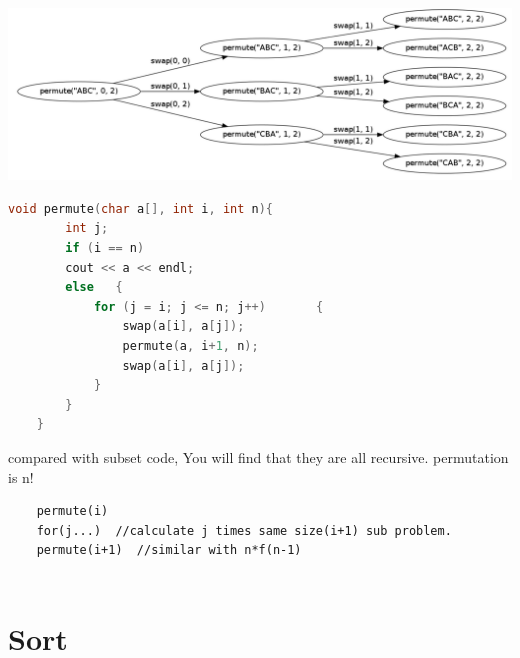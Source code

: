 \documentclass[a4paper,11pt,twoside]{book}
\begin{document}
\begin{itemize}
\includegraphics[scale=0.25]{pics/permutation.png}


\begin{lstlisting}[frame=single, language=c++]
	void permute(char a[], int i, int n){
		int j;
		if (i == n)
		cout << a << endl;
		else   {
			for (j = i; j <= n; j++)       {
				swap(a[i], a[j]);          
				permute(a, i+1, n);
				swap(a[i], a[j]);
			}
		}
	} 	
\end{lstlisting}

compared with subset code, You will find that they are all recursive. permutation is n!
\begin{lstlisting}
	permute(i)
	for(j...)  //calculate j times same size(i+1) sub problem.
	permute(i+1)  //similar with n*f(n-1)
	
\end{lstlisting}


\end{itemize}

\section{Sort}
\end{document}

